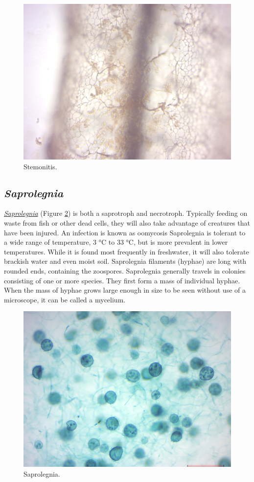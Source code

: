 \begin{figure}

{\centering \includegraphics[width=0.7\linewidth]{./figures/protists/stemonitis}

}

\caption{Stemonitis.}\label{fig:stemonitis}
\end{figure}

\subsection{\texorpdfstring{\emph{Saprolegnia}}{Saprolegnia}}\label{saprolegnia}

\href{https://en.wikipedia.org/wiki/Saprolegnia}{\emph{Saprolegnia}}
(Figure \ref{fig:saprolegnia}) is both a saprotroph and necrotroph.
Typically feeding on waste from fish or other dead cells, they will also
take advantage of creatures that have been injured. An infection is
known as oomycosis Saprolegnia is tolerant to a wide range of
temperature, 3 °C to 33 °C, but is more prevalent in lower temperatures.
While it is found most frequently in freshwater, it will also tolerate
brackish water and even moist soil. Saprolegnia filaments (hyphae) are
long with rounded ends, containing the zoospores. Saprolegnia generally
travels in colonies consisting of one or more species. They first form a
mass of individual hyphae. When the mass of hyphae grows large enough in
size to be seen without use of a microscope, it can be called a
mycelium.

\begin{figure}

{\centering \includegraphics[width=0.7\linewidth]{./figures/protists/saprolegnia}

}

\caption{Saprolegnia.}\label{fig:saprolegnia}
\end{figure}

